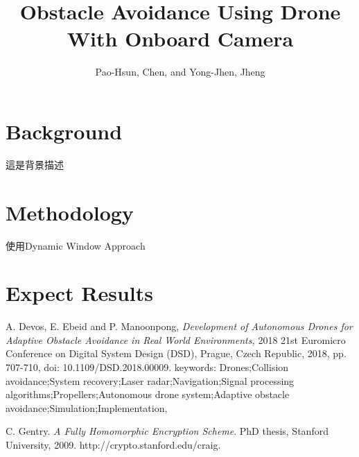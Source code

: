 \documentclass[]{article}
\title{Obstacle Avoidance Using Drone With Onboard Camera}
\author{Pao-Hsun, Chen, and Yong-Jhen, Jheng}
\begin{document}
	
	\maketitle
	
	\section{Background}
     這是背景描述
	\section{Methodology}
	使用Dynamic Window Approach
	\section{Expect Results}
	
	
	\begin{thebibliography}{1}
		
		A. Devos, E. Ebeid and P. Manoonpong, \emph{Development of Autonomous Drones for Adaptive Obstacle Avoidance in Real World Environments,} 2018 21st Euromicro Conference on Digital System Design (DSD), Prague, Czech Republic, 2018, pp. 707-710, doi: 10.1109/DSD.2018.00009. keywords: {Drones;Collision avoidance;System recovery;Laser radar;Navigation;Signal processing algorithms;Propellers;Autonomous drone system;Adaptive obstacle avoidance;Simulation;Implementation},
		
		
		
		C. Gentry. \emph{A Fully Homomorphic Encryption Scheme}. PhD thesis, Stanford University, 2009. http://crypto.stanford.edu/craig.
		
	\end{thebibliography}
	
\end{document}

